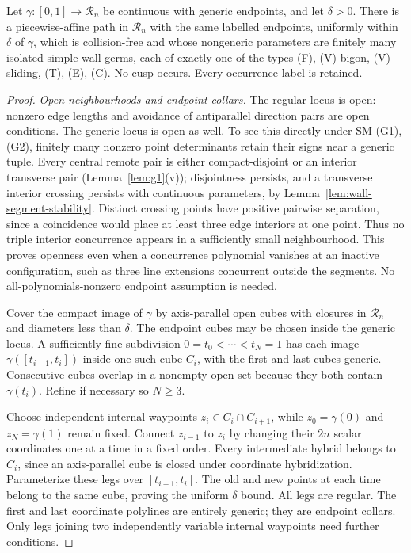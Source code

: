 \begin{theorem}
\label{thm:relgp}
Let $\gamma:[0,1]\to\mathcal R_n$ be continuous with generic endpoints,
and let $\delta>0$. There is a piecewise-affine path in $\mathcal R_n$ with
the same labelled endpoints, uniformly within $\delta$ of $\gamma$, which
is collision-free and whose nongeneric parameters are finitely many isolated
simple wall germs, each of exactly one of the types (F), (V) bigon, (V)
sliding, (T), (E), (C). No cusp occurs. Every occurrence label is retained.
\end{theorem}
\begin{proof}
\emph{Open neighbourhoods and endpoint collars.}
The regular locus is open: nonzero edge lengths and avoidance of antiparallel
direction pairs are open conditions. The generic locus is open as well.
To see this directly under SM (G1),(G2), finitely many nonzero point determinants
retain their signs near a generic tuple. Every central remote pair is either
compact-disjoint or an interior transverse pair (Lemma~\ref{lem:g1}(v));
disjointness persists, and a transverse interior crossing persists with
continuous parameters, by Lemma~\ref{lem:wall-segment-stability}. Distinct crossing points have positive pairwise separation, since
a coincidence would place at least three edge interiors at one point. Thus
no triple interior concurrence appears in a sufficiently small neighbourhood.
This proves openness even when a concurrence polynomial vanishes at an
inactive configuration, such as three line extensions concurrent outside the
segments. No all-polynomials-nonzero endpoint assumption is needed.

Cover the compact image of $\gamma$ by axis-parallel open cubes with closures
in $\mathcal R_n$ and diameters less than $\delta$. The endpoint cubes may
be chosen inside the generic locus. A sufficiently fine subdivision
$0=t_0<\cdots<t_N=1$ has each image
$\gamma([t_{i-1},t_i])$ inside one such cube $C_i$, with the first and last
cubes generic. Consecutive cubes overlap in a nonempty open set because they
both contain $\gamma(t_i)$. Refine if necessary so $N\geq3$.

Choose independent internal waypoints $z_i\in C_i\cap C_{i+1}$, while
$z_0=\gamma(0)$ and $z_N=\gamma(1)$ remain fixed. Connect $z_{i-1}$ to $z_i$
by changing their $2n$ scalar coordinates one at a time in a fixed order.
Every intermediate hybrid belongs to $C_i$, since an axis-parallel cube is
closed under coordinate hybridization. Parameterize these legs over
$[t_{i-1},t_i]$. The old and new points at each time belong to the same
cube, proving the uniform $\delta$ bound. All legs are regular. The first
and last coordinate polylines are entirely generic; they are endpoint collars.
Only legs joining two independently variable internal waypoints need further
conditions.


\end{proof}
